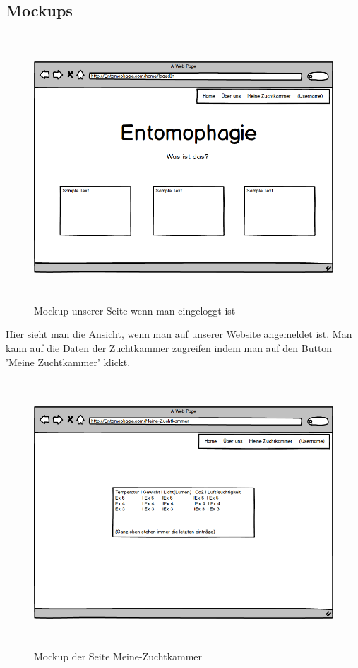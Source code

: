 \subsection{Mockups}
\begin{figure}
\includegraphics[height=10cm]{figures/Logedin}
\caption{Mockup unserer Seite wenn man eingeloggt ist}
\end{figure}                                                                                                                                                                  Hier sieht man die Ansicht, wenn man auf unserer Website angemeldet ist. Man kann auf die Daten der Zuchtkammer zugreifen indem man auf den Button 'Meine Zuchtkammer' klickt.
\newpage
\begin{figure}
\includegraphics[height=10cm]{figures/Meine-Zuchtkammer}
\caption{Mockup der Seite Meine-Zuchtkammer}
\end{figure}                                                                                                                                                      
